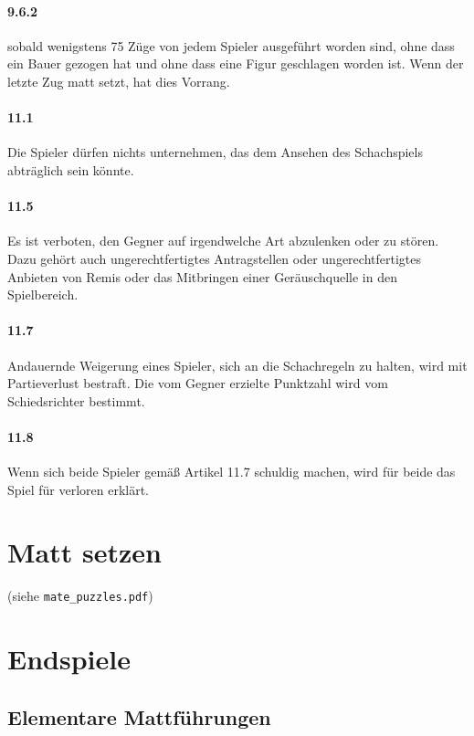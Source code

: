 \documentclass[
  a4paper,
  justified,
  nobib,
]{tufte-handout}
\begin{document}
\paragraph{9.6.2} sobald wenigstens 75 Züge von jedem Spieler ausgeführt worden sind, ohne
dass ein Bauer gezogen hat und ohne dass eine Figur geschlagen worden ist.
Wenn der letzte Zug matt setzt, hat dies Vorrang.
\paragraph{11.1} Die Spieler dürfen nichts unternehmen, das dem Ansehen des Schachspiels
abträglich sein könnte.
\paragraph{11.5} Es ist verboten, den Gegner auf irgendwelche Art abzulenken oder zu
stören. Dazu gehört auch ungerechtfertigtes Antragstellen oder ungerechtfertigtes
Anbieten von Remis oder das Mitbringen einer Geräuschquelle in den Spielbereich.
\paragraph{11.7} Andauernde Weigerung eines Spieler, sich an die Schachregeln zu halten,
wird mit Partieverlust bestraft. Die vom Gegner erzielte Punktzahl wird vom Schiedsrichter
bestimmt.
\paragraph{11.8} Wenn sich beide Spieler gemäß Artikel 11.7 schuldig machen, wird für
beide das Spiel für verloren erklärt.

\pagebreak

\section{Matt setzen}%
\label{sec:matt_setzen}

(siehe \texttt{mate\_puzzles.pdf})

\section{Endspiele}%
\label{sec:endspiele}

\subsection{Elementare Mattführungen}%
\label{sub:elementare_mattfuhrungen}
\end{document}

